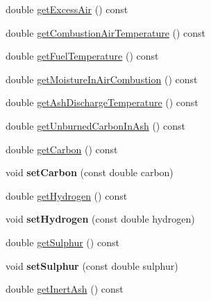 \begin{DoxyCompactItemize}
double \hyperlink{class_solid_liquid_flue_gas_material_a49e7bb4ebc45897c81b6f38610ceaf02}{get\+Excess\+Air} () const
\item 
double \hyperlink{class_solid_liquid_flue_gas_material_a8757b831e5a2ef26dbb0cf271c0e8207}{get\+Combustion\+Air\+Temperature} () const
\item 
double \hyperlink{class_solid_liquid_flue_gas_material_a629ecc7104b6bfbb696d9478c4b48e7a}{get\+Fuel\+Temperature} () const
\item 
double \hyperlink{class_solid_liquid_flue_gas_material_ae3d9780851b8217ed2885753f11ec18b}{get\+Moisture\+In\+Air\+Combustion} () const
\item 
double \hyperlink{class_solid_liquid_flue_gas_material_ab233d4e27397cc74fbe2d3084e4e6f7c}{get\+Ash\+Discharge\+Temperature} () const
\item 
double \hyperlink{class_solid_liquid_flue_gas_material_a53ac34a949168a35297ab3afb9eb2c7b}{get\+Unburned\+Carbon\+In\+Ash} () const
\item 
double \hyperlink{class_solid_liquid_flue_gas_material_a7b8a98111943d30094e2d6950f7f2ec1}{get\+Carbon} () const
\item 
\mbox{\label{class_solid_liquid_flue_gas_material_ab89eddf949fefcc1ade049233c2dc12b}} 
void {\bfseries set\+Carbon} (const double carbon)
\item 
double \hyperlink{class_solid_liquid_flue_gas_material_a26af2edd53c50b071648d03bc6442fb6}{get\+Hydrogen} () const
\item 
\mbox{\label{class_solid_liquid_flue_gas_material_a44788e445519bb719a8ff9ca04702e21}} 
void {\bfseries set\+Hydrogen} (const double hydrogen)
\item 
double \hyperlink{class_solid_liquid_flue_gas_material_abe35d8ff283bfa5aadcf00f9906025ae}{get\+Sulphur} () const
\item 
\mbox{\label{class_solid_liquid_flue_gas_material_a34e4eaeb424bcf02dc29a5ab98172ef5}} 
void {\bfseries set\+Sulphur} (const double sulphur)
\item 
double \hyperlink{class_solid_liquid_flue_gas_material_a0549b32b7b5423267d5f59cc96b98127}{get\+Inert\+Ash} () const
\item 
\mbox{\label{class_solid_liquid_flue_gas_material_a75a066ed50d810d5699fd53cb4376dc8}} 

\end{DoxyCompactItemize}
